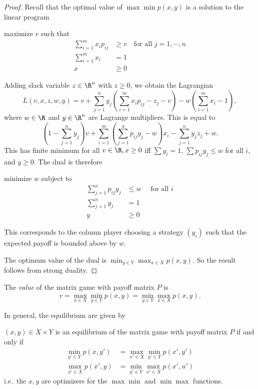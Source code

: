 \documentclass[a4paper]{article}
\begin{document}
\begin{proof}
  Recall that the optimal value of $\max\min p(x, y)$ is a solution to the linear program
  \begin{center}
    maximize $v$ such that
    \begin{align*}
      \sum_{i = 1}^m x_i p_{ij} &\geq v\quad\text{for all }j = 1, \cdots, n\\
      \sum_{i = 1}^m x_i &= 1\\
      x &\geq 0
    \end{align*}
  \end{center}
  Adding slack variable $z\in \R^n$ with $z \geq 0$, we obtain the Lagrangian
  \[
    L(v, x, z, w, y) = v + \sum_{j = 1}^n y_j\left(\sum_{i = 1}^m x_ip_{ij} - z_j - v\right) - w\left(\sum_{i = 1}^m x_i - 1\right),
  \]
  where $w\in \R$ and $y\in \R^n$ are Lagrange multipliers. This is equal to
  \[
    \left(1 - \sum_{j = 1}^n y_j\right)v + \sum_{i = 1}^m \left(\sum_{j = 1}^n p_{ij}y_j - w\right)x_i- \sum_{j = 1}^n y_j z_j + w.
  \]
  This has finite minimum for all $v\in \R, x \geq 0$ iff $\sum y_i = 1$, $\sum p_{ij}y_j \leq w$ for all $i$, and $y \geq 0$. The dual is therefore
  \begin{center}
    minimize $w$ subject to
    \begin{align*}
      \sum_{j = 1}^n p_{ij}y_j &\leq w\quad\text{ for all }i\\
      \sum_{j = 1}^n {y_j} &= 1\\
      y &\geq 0
    \end{align*}
  \end{center}
  This corresponds to the column player choosing a strategy $(y_i)$ such that the expected payoff is bounded above by $w$.

  The optimum value of the dual is $\displaystyle\min_{y\in Y}\max_{x\in X}p(x, y)$. So the result follows from strong duality.
\end{proof}

\begin{defi}[Value]
  The \emph{value} of the matrix game with payoff matrix $P$ is
  \[
    v = \max_{x\in X}\min_{y\in Y} p(x, y) = \min_{y\in Y}\max_{x\in X} p(x, y).
  \]
\end{defi}
In general, the equilibrium are given by
\begin{thm}
  $(x, y)\in X\times Y$ is an equilibrium of the matrix game with payoff matrix $P$ if and only if
  \begin{align*}
    \min_{y'\in Y} p(x, y') &= \max_{x' \in X}\min_{y'\in Y} p(x', y')\\
    \max_{x'\in X} p(x', y) &= \min_{y' \in Y}\max_{x'\in X} p(x', u')
  \end{align*}
  i.e.\ the $x, y$ are optimizers for the $\max\min$ and $\min\max$ functions.
\end{thm}
\end{document}
